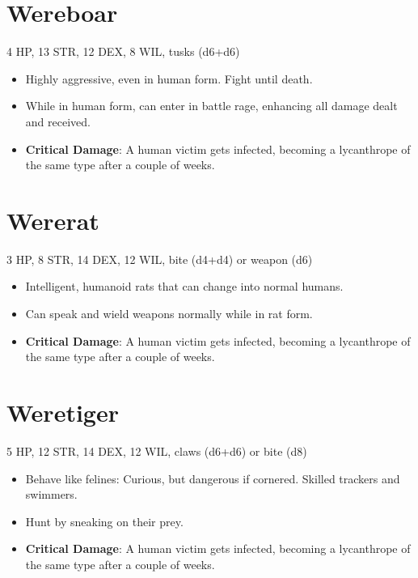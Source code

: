 \documentclass[
  10pt,
  american,
]{article}
\begin{document}
\hypertarget{wereboar}{%
\section{Wereboar}\label{wereboar}}

4 HP, 13 STR, 12 DEX, 8 WIL, tusks (d6+d6)

\begin{samepage}
\begin{itemize}
\setlength\itemsep{-.5em}
\item Highly aggressive, even in human form. Fight until death.
\item While in human form, can enter in battle rage, enhancing all damage dealt and received.
\item \textbf{Critical Damage}: A human victim gets infected, becoming a lycanthrope of the same type after a couple of weeks.
\end{itemize}
\end{samepage}

\hypertarget{wererat}{%
\section{Wererat}\label{wererat}}

3 HP, 8 STR, 14 DEX, 12 WIL, bite (d4+d4) or weapon (d6)

\begin{samepage}
\begin{itemize}
\setlength\itemsep{-.5em}
\item Intelligent, humanoid rats that can change into normal humans.
\item Can speak and wield weapons normally while in rat form.
\item \textbf{Critical Damage}: A human victim gets infected, becoming a lycanthrope of the same type after a couple of weeks.
\end{itemize}
\end{samepage}

\hypertarget{weretiger}{%
\section{Weretiger}\label{weretiger}}

5 HP, 12 STR, 14 DEX, 12 WIL, claws (d6+d6) or bite (d8)

\begin{samepage}
\begin{itemize}
\setlength\itemsep{-.5em}
\item Behave like felines: Curious, but dangerous if cornered. Skilled trackers and swimmers.
\item Hunt by sneaking on their prey.
\item \textbf{Critical Damage}: A human victim gets infected, becoming a lycanthrope of the same type after a couple of weeks.
\end{itemize}
\end{samepage}
\end{document}
